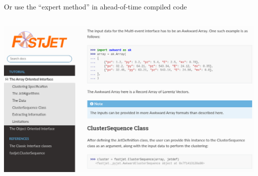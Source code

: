 \documentclass[aspectratio=169]{beamer}
\begin{document}
\begin{frame}{Or use the ``expert method'' in ahead-of-time compiled code}
\vspace{0.18 cm}
\begin{columns}
\includegraphics[width=\linewidth]{fastjet-documentation.png}
\end{columns}
\end{frame}
\end{document}
